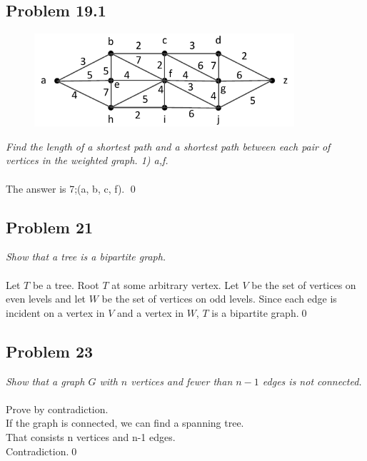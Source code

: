 \documentclass[
        ]{beamer}
\begin{document}
    \subsection{Problem 19.1}
        \begin{frame}[c]{\subsecname}
            \begin{figure}
                \centering
                \includegraphics[width=96.3mm]{tut11p17_1}
            \end{figure}
            \emph{Find the length of a shortest path and a shortest path between each pair of
vertices in the weighted graph. 1) a,f.}\\$\;$\\\pause
            The answer is 7;(a, b, c, f). \qed
        \end{frame}


    \subsection{Problem 21}
        \begin{frame}[c]{\subsecname}
            \emph{Show that a tree is a bipartite graph.}\\$\;$\\\pause
            Let $T$ be a tree. Root $T$ at some arbitrary vertex. Let $V$ be the set of vertices on even levels and let $W$ be the set of vertices on odd levels. Since each edge is incident on a vertex in $V$ and a vertex in $W$, $T$ is a bipartite graph.\qed
        \end{frame}



    \subsection{Problem 23}
        \begin{frame}[c]{\subsecname}
            \emph{Show that a graph $G$ with $n$ vertices and fewer than $n-1$ edges is not connected.}\\$\;$\\\pause
            Prove by contradiction.\\
            If the graph is connected, we can find a spanning tree. \\That consists n vertices and n-1 edges. \\Contradiction.\qed
        \end{frame}
\end{document}
